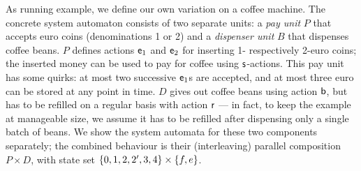 As running example, we define our own variation on a coffee machine. The concrete system automaton consists of two separate units: a \emph{pay unit} $P$ that accepts euro coins (denominations 1 or 2) and a \emph{dispenser unit} $B$ that dispenses coffee beans. $P$ defines actions $\mathsf{e}_1$ and $\mathsf{e}_2$ for inserting 1- respectively 2-euro coins; the inserted money can be used to pay for coffee using $\mathsf{s}$-actions. This pay unit has some quirks: at most two successive $\mathsf{e}_1$s are accepted, and at most three euro can be stored at any point in time. $D$ gives out coffee beans using action $\mathsf{b}$, but has to be refilled on a regular basis with action $\mathsf{r}$ --- in fact, to keep the example at manageable size, we assume it has to be refilled after dispensing only a single batch of beans. We show the system automata for these two components separately; the combined behaviour is their (interleaving) parallel composition $P\times D$, with state set $\{{0,1,2,2',3,4}\}\times \{{f,e}\}$.

\begin{center}
\qquad
{}
\end{center}

